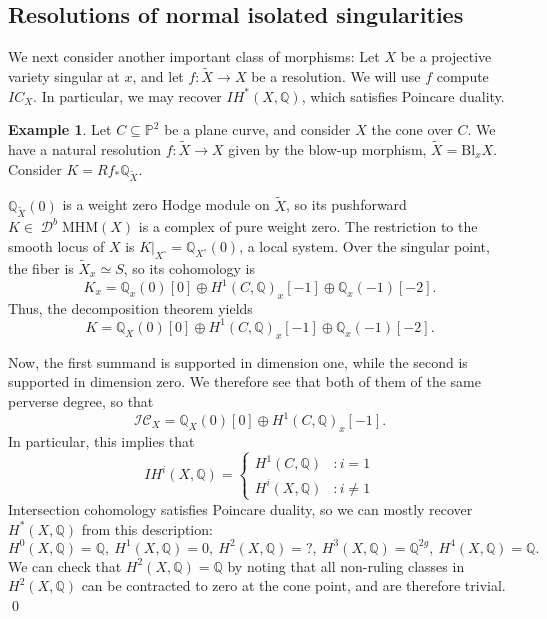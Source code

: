 \documentclass[12pt]{amsart}
\newcommand{\Q}{\mathbb{Q}}
\DeclareMathOperator{\D}{\mathcal{D}}
\newcommand{\wt}{\widetilde}
\theoremstyle{definition}
\newtheorem{example}[theorem]{Example}
\theoremstyle{remark}
\numberwithin{equation}{section}
\begin{document}
\subsection{Resolutions of normal isolated singularities}
We next consider another important class of morphisms: Let \(X\) be a projective 
variety singular at \(x\), and let \(f: \wt{X} \to X\) be a resolution. We will 
use \(f\) compute \(IC_X\). In particular, we may recover \(IH^*(X, \Q)\), which 
satisfies Poincare duality.

\begin{example}
Let \(C \subseteq \mathbb{P}^2\) be a plane curve, and consider \(X\) the cone
over \(C\). We have a natural resolution \(f: \wt{X} \to X\) given by the blow-up 
morphism, \(\wt{X} = \mathrm{Bl}_x X\). Consider \(K = Rf_* \Q_{\wt{X}}\).

\(\Q_{\wt X}(0)\) is a weight zero Hodge module on \(\wt{X}\), so its pushforward 
\(K \in \D^b\mathrm{MHM}(X)\) is a complex of pure weight zero. The restriction 
to the smooth locus of \(X\) is \(K|_{X^\circ} = \Q_{X^\circ}(0)\), a local system.
Over the singular point, the fiber is \(\wt{X}_x \simeq S\), so its cohomology is
\begin{equation}
    K_x = \Q_x(0)[0] \oplus H^1(C, \Q)_x[-1] \oplus \Q_x(-1)[-2].
\end{equation}
Thus, the decomposition theorem yields 
\begin{equation}
    K = \Q_X(0)[0] \oplus H^1(C, \Q)_x[-1] \oplus \Q_x(-1)[-2].
\end{equation}

Now, the first summand is supported in dimension one, while the second is supported 
in dimension zero. We therefore see that both of them of the same perverse degree,
so that 
\begin{equation}
    \mathscr{IC}_X = \Q_X(0)[0] \oplus H^1(C, \Q)_x[-1].
\end{equation}
In particular, this implies that 
\begin{equation}
    IH^i(X, \Q) = \begin{cases}
        H^1(C, \Q) & : i = 1 \\
        H^i(X, \Q) & : i \neq 1
    \end{cases}
\end{equation}
Intersection cohomology satisfies Poincare duality, so we can mostly recover 
\(H^*(X, \Q)\) from this description:
\begin{equation}
    H^0(X, \Q) = \Q,\ H^1(X, \Q) = 0,\ H^2(X, \Q) = ?,\ H^3(X, \Q) = \Q^{2g},\ 
    H^4(X, \Q) = \Q.
\end{equation}
We can check that \(H^2(X, \Q) = \Q\) by noting that all non-ruling classes in 
\(H^2(X, \Q)\) can be contracted to zero at the cone point, and are therefore trivial.
\qed
\end{example}
\end{document}
